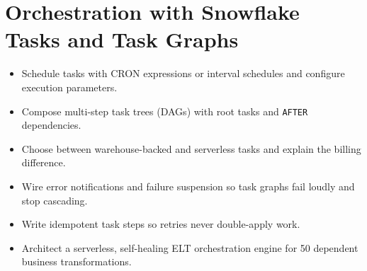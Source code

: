 \chapter{Orchestration with Snowflake Tasks and Task Graphs}
%
\begin{objectives}
\begin{itemize}
    \item Schedule tasks with CRON expressions or interval schedules and configure execution parameters.
    \item Compose multi-step task trees (DAGs) with root tasks and \texttt{AFTER} dependencies.
    \item Choose between warehouse-backed and serverless tasks and explain the billing difference.
    \item Wire error notifications and failure suspension so task graphs fail loudly and stop cascading.
    \item Write idempotent task steps so retries never double-apply work.
    \item Architect a serverless, self-healing ELT orchestration engine for 50 dependent business transformations.
\end{itemize}
\end{objectives}

